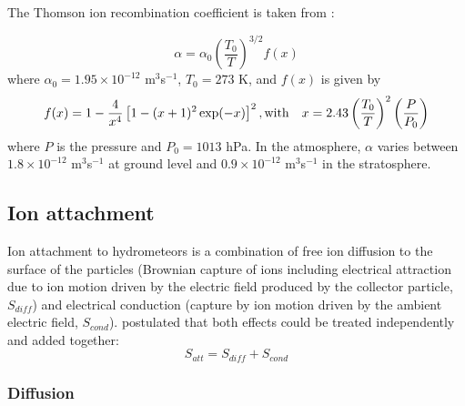 The Thomson ion recombination coefficient is taken from \citet{Helsdon-2002}:

\begin{equation}
  \alpha=\alpha_0 \left(\frac{T_0}{T}\right)^{3/2} f(x)
\end{equation}
where $\alpha_0=1.95\times10^{-12}$ m$^3$s$^{-1}$, $T_0=273$ K, and $f(x)$ is given by
\begin{equation}
  f(x)=1-\frac{4}{x^4}\left[1-(x+1)^2\exp(-x)\right]^2, {\rm with} \quad x=2.43 \left(\frac{T_0}{T}\right)^{2}\left(\frac{P}{P_0}\right)
\end{equation}
where $P$ is the pressure and $P_0=1013$ hPa. In the atmosphere, $\alpha$ varies between $1.8\times10^{-12}$ m$^3$s$^{-1}$ at ground level and $0.9\times10^{-12}$ m$^3$s$^{-1}$ in the stratosphere.

\subsection{Ion attachment}

Ion attachment to hydrometeors is a combination of free ion diffusion to the surface of the particles (Brownian capture of ions including electrical attraction due to ion motion driven by the electric field produced by the collector particle, $S_{diff}$) and electrical conduction (capture by ion motion driven by the ambient electric field, $S_{cond}$). 
\citet{Chiu-1978} postulated that both effects could be treated independently and added together:
\begin{equation}
  S_{att} = S_{diff} + S_{cond}
\end{equation}

\subsubsection{Diffusion}

